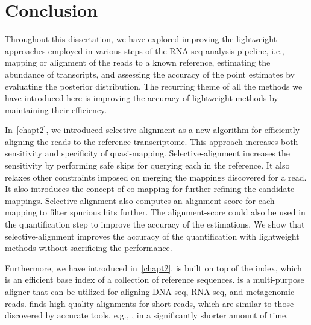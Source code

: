 
\renewcommand{\thechapter}{5}

\chapter[Conclusion]{Conclusion} 
\label{conclusion}

Throughout this dissertation, we have explored improving the lightweight approaches employed 
in various steps of the RNA-seq analysis pipeline, i.e., mapping or alignment of the reads to 
a known reference, estimating the abundance of transcripts, and assessing the accuracy of the 
point estimates by evaluating the posterior distribution.
The recurring theme of all the methods we have introduced here is improving the accuracy of 
lightweight methods by maintaining their efficiency.
 
In~\cref{chapt2}, we introduced selective-alignment as a new algorithm for efficiently
aligning the reads to the reference transcriptome. This approach increases both sensitivity
and specificity of quasi-mapping. Selective-alignment increases the sensitivity by performing
safe skips for querying each \kmer in the reference. It also relaxes other constraints
imposed on merging the mappings discovered for a read. It also introduces the concept of
co-mapping for further refining the candidate mappings. Selective-alignment also computes
an alignment score for each mapping to filter spurious hits further. The alignment-score
could also be used in the quantification step to improve the accuracy of the estimations.
We show that selective-alignment improves the accuracy of the quantification with lightweight
methods without sacrificing the performance.
 
Furthermore, we have introduced \puffaligner in~\cref{chapt2}. \puffaligner is built on top
of the \pufferfish index, which is an efficient \ccdbg base index of a collection of reference
sequences. \puffaligner is a multi-purpose aligner that can be utilized for aligning DNA-seq,
RNA-seq, and metagenomic reads. \puffaligner finds high-quality alignments for short reads,
which are similar to those discovered by accurate tools, e.g., \bt, in a significantly shorter amount
of time.
 
